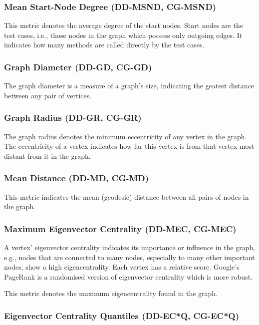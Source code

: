 \documentclass{scrartcl}
\begin{document}
\subsubsection{Mean Start-Node Degree (DD-MSND, CG-MSND)}

This metric denotes the average degree of the start nodes. Start nodes are the
test cases, i.e., those nodes in the graph which possess only outgoing edges. It
indicates how many methods are called directly by the test cases.

\subsubsection{Graph Diameter (DD-GD, CG-GD)}

The graph diameter is a measure of a graph's size, indicating the geatest
distance between any pair of vertices.

\subsubsection{Graph Radius (DD-GR, CG-GR)}

The graph radius denotes the minimum eccentricity of any vertex in the graph.
The eccentricity of a vertex indicates how far this vertex is from that vertex
most distant from it in the graph.

\subsubsection{Mean Distance (DD-MD, CG-MD)}

This metric indicates the mean (geodesic) distance between all pairs of nodes in
the graph.

\subsubsection{Maximum Eigenvector Centrality (DD-MEC, CG-MEC)}

A vertex' eigenvector centrality indicates its importance or influence in the
graph, e.g., nodes that are connected to many nodes, especially to many other
important nodes, show a high eigencentrality. Each vertex has a relative score.
Google's PageRank is a randomised version of eigenvector centrality which is
more robust. 

This metric denotes the maximum eigencentrality found in the graph.

\subsubsection{Eigenvector Centrality Quantiles (DD-EC*Q, CG-EC*Q)}
\end{document}
